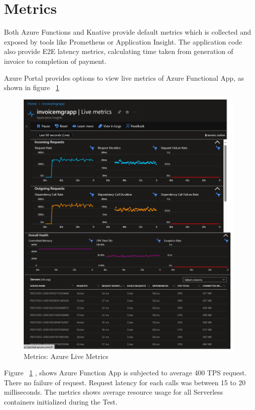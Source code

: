 \documentclass{article}
\begin{document}
\section{Metrics}
\begin{flushleft}
Both Azure Functions and Knative provide default metrics which is collected and exposed by tools like Prometheus or Application Insight. The application code also provide E2E latency metrics, calculating time taken from generation of invoice to completion of payment. 
\par
Azure Portal provides options to view live metrics of Azure Functional App, as shown in figure ~\ref{azure_live_metrics}

\begin{figure}[h]
    \centering
    \includegraphics[scale=0.5]{images/AzurePerfCapture/liveMetrics.png}
    \caption{Metrics: Azure Live Metrics}
    \label{azure_live_metrics}
\end{figure}
\pagebreak
\par
Figure ~\ref{azure_live_metrics} , shows Azure Function App is subjected to average 400 \gls{TPS} request. There no failure of request. Request latency for each calls was between 15 to 20 milliseconds.
\hfill \break
The metrics shows average resource usage for all Serverless containers initialized during the Test.
\break


\end{flushleft}
\end{document}
